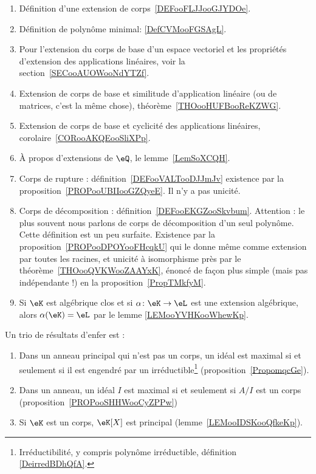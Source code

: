 
 \label{THEMEooZYKFooQXhiPD}
\begin{enumerate}
	\item
	      Définition d'une extension de corps~\ref{DEFooFLJJooGJYDOe}.
	\item
	      Définition de polynôme minimal: \ref{DefCVMooFGSAgL}.
	\item
	      Pour l'extension du corps de base d'un espace vectoriel et les propriétés d'extension des applications linéaires, voir la section~\ref{SECooAUOWooNdYTZf}.
	\item
	      Extension de corps de base et similitude d'application linéaire (ou de matrices, c'est la même chose), théorème~\ref{THOooHUFBooReKZWG}.
	\item
	      Extension de corps de base et cyclicité des applications linéaires, corolaire~\ref{CORooAKQEooSliXPp}.
	\item
	      À propos d'extensions de \( \eQ\), le lemme~\ref{LemSoXCQH}.
	\item
	      Corps de rupture : définition~\ref{DEFooVALTooDJJmJv} existence par la proposition~\ref{PROPooUBIIooGZQyeE}. Il n'y a pas unicité.
	\item
	      Corps de décomposition : définition~\ref{DEFooEKGZooSkvbum}. Attention : le plus souvent nous parlons de corps de décomposition d'un seul polynôme. Cette définition est un peu surfaite. Existence par la proposition~\ref{PROPooDPOYooFHcqkU} qui le donne même comme extension par toutes les racines, et unicité à isomorphisme près par le théorème~\ref{THOooQVKWooZAAYxK}, énoncé de façon plus simple (mais pas indépendante !) en la proposition~\ref{PropTMkfyM}.
	\item
	      Si \( \eK\) est algébrique clos et si \( \alpha\colon \eK\to \eL\) est une extension algébrique, alors \( \alpha(\eK)=\eL\) par le lemme \ref{LEMooYVHKooWhewKp}.
\end{enumerate}

Un trio de résultats d'enfer est :
\begin{enumerate}
	\item
        Dans un anneau principal qui n'est pas un corps, un idéal est maximal si et seulement si il est engendré par un irréductible\footnote{Irréductibilité, y compris polynôme irréductible, définition \ref{DeirredBDhQfA}.} (proposition~\ref{PropomqcGe}).
	\item
	      Dans un anneau, un idéal \( I\) est maximal si et seulement si \( A/I\) est un corps (proposition~\ref{PROPooSHHWooCyZPPw})
	\item
	      Si \( \eK\) est un corps, \( \eK[X]\) est principal (lemme~\ref{LEMooIDSKooQfkeKp}).
\end{enumerate}
